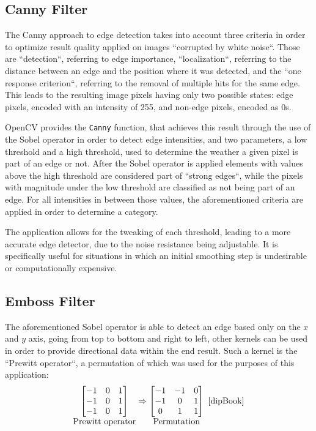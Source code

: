 \subsection{Canny Filter}

The Canny approach to edge detection takes into account three criteria in order to optimize result quality
applied on images ``corrupted by white noise``. Those are ``detection``, referring to edge importance,
``localization``, referring to the distance between an edge and the position where it was detected, and the
``one response criterion``, referring to the removal of multiple hits for the same edge. This leads to the
resulting image pixels having only two possible states: edge pixels, encoded with an intensity of 255, and
non-edge pixels, encoded as 0s.

OpenCV provides the \verb|Canny| function, that achieves this result through the use of the Sobel operator
in order to detect edge intensities, and two parameters, a low threshold and a high threshold, used to
determine the weather a given pixel is part of an edge or not. After the Sobel operator is applied
elements with values above the high threshold are considered part of ``strong edges``, while the pixels with
magnitude under the low threshold are classified as not being part of an edge. For all intensities in between
those values, the aforementioned criteria are applied in order to determine a category.

The application allows for the tweaking of each threshold, leading to a more accurate edge detector, due to
the noise resistance being adjustable. It is specifically useful for situations in which an initial smoothing
step is undesirable or computationally expensive.

\subsection{Emboss Filter}

The aforementioned Sobel operator is able to detect an edge based only on the \(x\) and \(y\) axis, going from
top to bottom and right to left, other kernels can be used in order to provide directional data within the end
result. Such a kernel is the ``Prewitt operator``, a permutation of which was used for the purposes of this
application:
\begin{equation}
	\mathop{
		\begin{bmatrix}
			-1 & 0 & 1 \\
			-1 & 0 & 1 \\
			-1 & 0 & 1 \\
		\end{bmatrix}
	}_{\textstyle \text{Prewitt operator}}
	\Rightarrow
	\mathop{
		\begin{bmatrix}
			-1 & -1 & 0 \\
			-1 & 0  & 1 \\
			0  & 1  & 1 \\
		\end{bmatrix}
    }_{\textstyle \text{Permutation}}
	\text{ \cite{dipBook}}
\end{equation}

